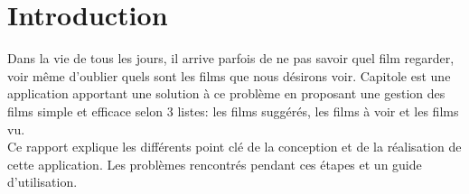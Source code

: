 \chapter{Introduction}

Dans la vie de tous les jours, il arrive parfois de ne pas savoir quel film regarder, voir même d'oublier quels sont les films que nous désirons voir. Capitole est une application apportant une solution à ce problème en proposant une gestion des films simple et efficace selon 3 listes: les films suggérés, les films à voir et les films vu.\\

Ce rapport explique les différents point clé de la conception et de la réalisation de cette application. Les problèmes rencontrés pendant ces étapes et un guide d'utilisation.